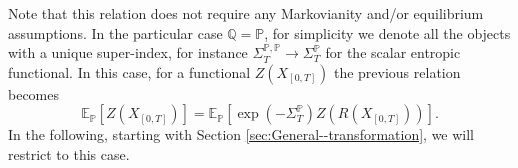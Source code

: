 \documentclass[a4paper,11pt]{article}
\numberwithin{equation}{section}
\begin{document}
\noindent
Note that this relation does not require any Markovianity and/or equilibrium assumptions. In the particular case $\mathbb{Q}=\mathbb{P}$, for simplicity we denote all the objects with a unique super-index, for instance $\varSigma_{T}^{\mathbb{P},\mathbb{P}}\rightarrow \varSigma_{T}^{\mathbb{P}}$
for the scalar entropic functional. In this case, for a functional $Z\left(X_{\left[0,T\right]}\right)$ the previous relation becomes 
\begin{equation}
\mathbb{E}_{\mathbb{P}}\left[Z\left(X_{\left[0,T\right]}\right)\right]=\mathbb{E}_{\mathbb{P}}\left[\exp\left(-\varSigma_{T}^{\mathbb{P}}\right)Z\left(R\left(X_{\left[0,T\right]}\right)\right)\right].\label{eq:MRF-1}
\end{equation}
In the following, starting with Section \ref{sec:General--transformation}, we will restrict to this case.
\end{document}
